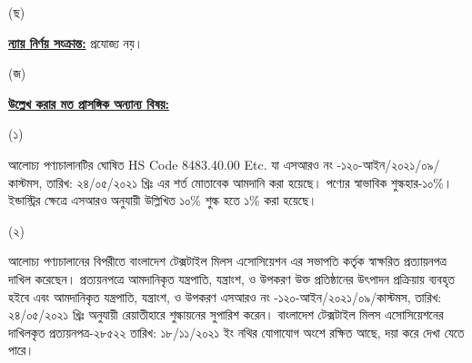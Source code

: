 \documentclass[12pt]{article}
\newcommand{\hscode}{8483.40.00 Etc.}
\newcommand{\srooot}{এসআরও নং -১২০-আইন/২০২১/০৯/কাস্টমস}
\newcommand{\sroootd}{তারিখ: ২৪/০৫/২০২১ খ্রিঃ}
\begin{document}
\begin{minipage}[t]{0.05\linewidth}
\hspace{1em}
\end{minipage}
\begin{minipage}[t]{0.05\linewidth}
(ছ)
\end{minipage}
\begin{minipage}[t]{0.90\linewidth}
\underline{\textbf{ন্যায় নির্ণয় সংক্রান্ত:}} প্রযোজ্য নয়।
\\
\end{minipage}
\begin{minipage}[t]{0.05\linewidth}
\hspace{1em}
\end{minipage}
\begin{minipage}[t]{0.05\linewidth}
(জ)
\end{minipage}
\begin{minipage}[t]{0.05\linewidth}
\end{minipage}
\begin{minipage}[t]{0.90\linewidth}
\underline{\textbf{উল্লেখ করার মত প্রাসঙ্গিক অন্যান্য বিষয়:}}
\end{minipage}
\begin{minipage}[t]{0.05\linewidth}
\hspace{1em}
\end{minipage}
\begin{minipage}[t]{0.05\linewidth}
\hspace{1em}
\end{minipage}
\begin{minipage}[t]{0.05\linewidth}
(১)
\end{minipage}
\begin{minipage}[t]{0.85\linewidth}
আলোচ্য পণ্যচালানটির ঘোষিত HS Code {\hscode}
যা {\srooot}, {\sroootd} এর শর্ত মোতাবেক
আমদানি করা হয়েছে। পণ্যের স্বাভাবিক শুল্কহার-১০\%।
ইন্ডাস্ট্রির ক্ষেত্রে এসআরও অনুযায়ী উল্লিখিত
১০\% শুল্ক হতে ১\% করা হয়েছে।
\end{minipage}
\begin{minipage}[t]{0.05\linewidth}
\hspace{1em}
\end{minipage}
\begin{minipage}[t]{0.05\linewidth}
\hspace{1em}
\end{minipage}
\begin{minipage}[t]{0.05\linewidth}
(২)
\end{minipage}
\begin{minipage}[t]{0.85\linewidth}
আলোচ্য পণ্যচালানের বিপরীতে বাংলাদেশ
টেক্সটাইল মিলস এসোসিয়েশন এর সভাপতি
কর্তৃক স্বাক্ষরিত প্রত্যায়নপত্র
দাখিল করেছেন। প্রত্যয়নপত্রে আমদানিকৃত
যন্ত্রপাতি, যন্ত্রাংশ, ও উপকরণ
উক্ত প্রতিষ্ঠানের উৎপাদন প্রক্রিয়ায়
ব্যবহৃত হইবে এবং আমদানিকৃত
যন্ত্রপাতি, যন্ত্রাংশ, ও উপকরণ
{\srooot}, {\sroootd} অনুযায়ী
রেয়াতীহারে শুল্কায়নের সুপারিশ
করেন। বাংলাদেশ টেক্সটাইল মিলস
এসোসিয়েশনের দাখিলকৃত প্রত্যয়নপত্র-২৮৫২২
তারিখ: ১৮/১১/২০২১ ইং নথির যোগাযোগ অংশে রক্ষিত
আছে, দয়া করে দেখা যেতে পারে।
\end{minipage}
\end{document}

